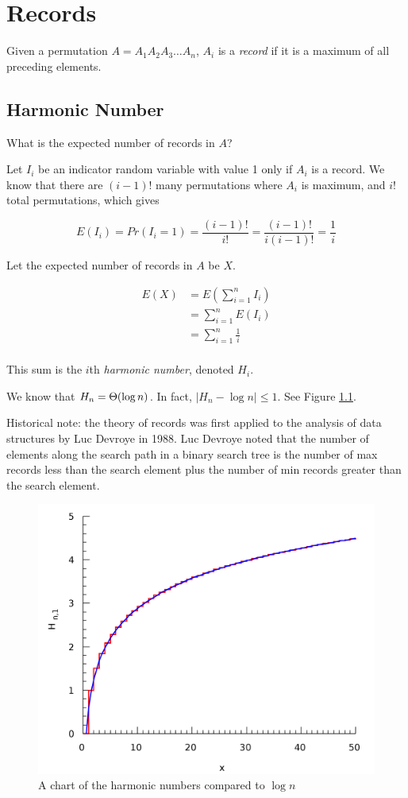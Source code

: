 \chapter{Records}

Given a permutation $A = A_1 A_2 A_3 \ldots A_n$, $A_i$ is a
\emph{record} if it is a maximum of all preceding elements.

\section{Harmonic Number}

What is the expected number of records in $A$?

Let $I_i$ be an indicator random variable with value 1 only if $A_i$
is a record.  We know that there are $(i-1)!$ many permutations where
$A_i$ is maximum, and $i!$ total permutations, which gives 

\begin{displaymath}
  E(I_i) = Pr(I_i = 1) = \frac{(i-1)!}{i!} = \frac{(i-1)!}{i (i-1)!} = \frac{1}{i}
\end{displaymath}

Let the expected number of records in $A$ be $X$.

\begin{align*}
  E(X)
  &= E \left( \sum_{i=1}^{n} I_i \right) \\
  &= \sum_{i=1}^{n} E(I_i) \\
  &= \sum_{i=1}^{n} \frac{1}{i} \\
\end{align*}

This sum is the $i$th \emph{harmonic number}, denoted $H_i$.

We know that $H_n = \Theta\!\left(\log n\right)$.  In fact, $ \left| H_n - \log
  n \right| \le 1$.  See Figure \ref{fig:HarmonicNumbers}.

Historical note: the theory of records was first applied to the
analysis of data structures by Luc Devroye in 1988\cite{Devroye:1988}.
Luc Devroye noted that the number of elements along the search path in
a binary search tree is the number of max records less than the search
element plus the number of min records greater than the search
element.


\begin{figure}
  \label{fig:HarmonicNumbers}
  \centering
  \includegraphics[scale=0.25]{HarmonicNumbers}
  \caption{A chart of the harmonic numbers compared to $\log n$}  
\end{figure}